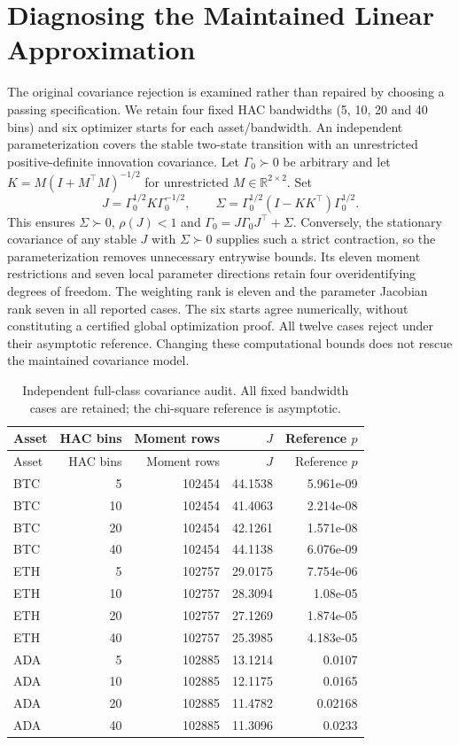 
\section{Diagnosing the Maintained Linear Approximation}
\label{sec:model_diagnostic_audit}
The original covariance rejection is examined rather than repaired by choosing a passing specification. We retain four fixed HAC bandwidths (5, 10, 20 and 40 bins) and six optimizer starts for each asset/bandwidth. An independent parameterization covers the stable two-state transition with an unrestricted positive-definite innovation covariance. Let $\Gamma_0\succ0$ be arbitrary and let $K=M(I+M^\top M)^{-1/2}$ for unrestricted $M\in\mathbb R^{2\times2}$. Set
\[
J=\Gamma_0^{1/2}K\Gamma_0^{-1/2},\qquad
\Sigma=\Gamma_0^{1/2}(I-KK^\top)\Gamma_0^{1/2}.
\]
This ensures $\Sigma\succ0$, $\rho(J)<1$ and $\Gamma_0=J\Gamma_0J^\top+\Sigma$. Conversely, the stationary covariance of any stable $J$ with $\Sigma\succ0$ supplies such a strict contraction, so the parameterization removes unnecessary entrywise bounds. Its eleven moment restrictions and seven local parameter directions retain four overidentifying degrees of freedom. The weighting rank is eleven and the parameter Jacobian rank seven in all reported cases. The six starts agree numerically, without constituting a certified global optimization proof. All twelve cases reject under their asymptotic reference. Changing these computational bounds does not rescue the maintained covariance model.

\begin{longtable}{lrrrr}
\caption{Independent full-class covariance audit. All fixed bandwidth cases are retained; the chi-square reference is asymptotic.}\label{tab:covariance_audit_complete}\\
\toprule Asset & HAC bins & Moment rows & $J$ & Reference $p$\\\midrule\endfirsthead
\toprule Asset & HAC bins & Moment rows & $J$ & Reference $p$\\\midrule\endhead
\bottomrule\endfoot
BTC & 5 & 102454 & 44.1538 & 5.961e-09\\
BTC & 10 & 102454 & 41.4063 & 2.214e-08\\
BTC & 20 & 102454 & 42.1261 & 1.571e-08\\
BTC & 40 & 102454 & 44.1138 & 6.076e-09\\
ETH & 5 & 102757 & 29.0175 & 7.754e-06\\
ETH & 10 & 102757 & 28.3094 & 1.08e-05\\
ETH & 20 & 102757 & 27.1269 & 1.874e-05\\
ETH & 40 & 102757 & 25.3985 & 4.183e-05\\
ADA & 5 & 102885 & 13.1214 & 0.0107\\
ADA & 10 & 102885 & 12.1175 & 0.0165\\
ADA & 20 & 102885 & 11.4782 & 0.02168\\
ADA & 40 & 102885 & 11.3096 & 0.0233\\
\end{longtable}

